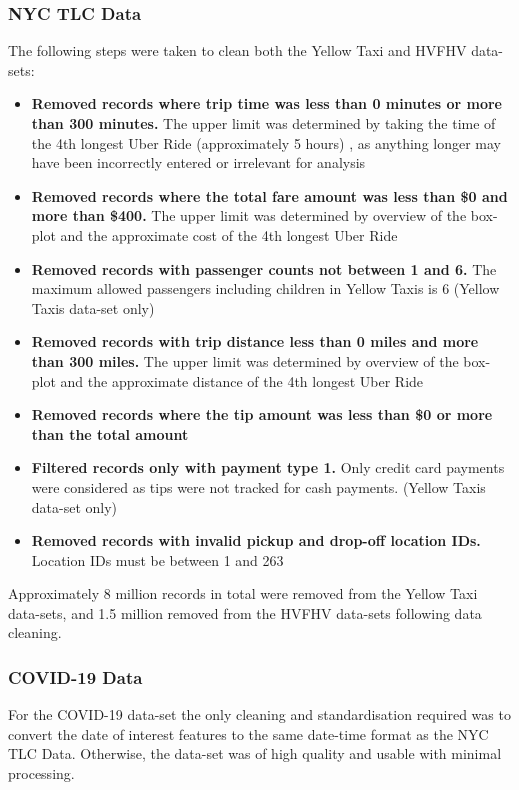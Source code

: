 \documentclass[11pt]{article}
\begin{document}
\subsubsection{NYC TLC Data}
The following steps were taken to clean both the Yellow Taxi and HVFHV data-sets:
\begin{itemize}
    \item \textbf{Removed records where trip time was less than 0 minutes or more than 300 minutes.} The upper limit was determined by taking the time of the 4th longest Uber Ride (approximately 5 hours) \cite{longest_ubers}, as anything longer may have been incorrectly entered or irrelevant for analysis
    \item \textbf{Removed records where the total fare amount was less than \$0 and more than \$400.} The upper limit was determined by overview of the box-plot and the approximate cost of the 4th longest Uber Ride \cite{longest_ubers} 
    \item \textbf{Removed records with passenger counts not between 1 and 6.} The maximum allowed passengers including children in Yellow Taxis is 6 \cite{YT_max_passengers} (Yellow Taxis data-set only)
    \item \textbf{Removed records with trip distance less than 0 miles and more than 300 miles.} The upper limit was determined by overview of the box-plot and the approximate distance of the 4th longest Uber Ride \cite{longest_ubers}
    \item \textbf{Removed records where the tip amount was less than \$0 or more than the total amount}
    \item \textbf{Filtered records only with payment type 1.} Only credit card payments were considered as tips were not tracked for cash payments. (Yellow Taxis data-set only)
    \item \textbf{Removed records with invalid pickup and drop-off location IDs.} Location IDs must be between 1 and 263
\end{itemize}

Approximately 8 million records in total were removed from the Yellow Taxi data-sets, and 1.5 million removed from the HVFHV data-sets following data cleaning. 

\subsubsection{COVID-19 Data}
For the COVID-19 data-set the only cleaning and standardisation required was to convert the date of interest features to the same date-time format as the NYC TLC Data. Otherwise, the data-set was of high quality and usable with minimal processing.
\end{document}
